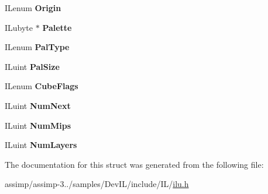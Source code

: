 \begin{DoxyCompactItemize}
\item 
\hypertarget{struct_i_linfo_ac6c29ee25a953e3241e2aea2b33c4729}{I\+Lenum {\bfseries Origin}}\label{struct_i_linfo_ac6c29ee25a953e3241e2aea2b33c4729}

\item 
\hypertarget{struct_i_linfo_aba4b972c5ce55e46ec329e8064003daa}{I\+Lubyte $\ast$ {\bfseries Palette}}\label{struct_i_linfo_aba4b972c5ce55e46ec329e8064003daa}

\item 
\hypertarget{struct_i_linfo_ab505e99ad9677eec785a11533bfa5d73}{I\+Lenum {\bfseries Pal\+Type}}\label{struct_i_linfo_ab505e99ad9677eec785a11533bfa5d73}

\item 
\hypertarget{struct_i_linfo_adaae3e63a61a73bf3c2a3092053763ef}{I\+Luint {\bfseries Pal\+Size}}\label{struct_i_linfo_adaae3e63a61a73bf3c2a3092053763ef}

\item 
\hypertarget{struct_i_linfo_a89fb88cd2ce7abbed0b5911173f20d84}{I\+Lenum {\bfseries Cube\+Flags}}\label{struct_i_linfo_a89fb88cd2ce7abbed0b5911173f20d84}

\item 
\hypertarget{struct_i_linfo_ad1201a015dd266f557eccc97ed2e7c05}{I\+Luint {\bfseries Num\+Next}}\label{struct_i_linfo_ad1201a015dd266f557eccc97ed2e7c05}

\item 
\hypertarget{struct_i_linfo_aebc89ad01ce03ce249a33ea099c4a560}{I\+Luint {\bfseries Num\+Mips}}\label{struct_i_linfo_aebc89ad01ce03ce249a33ea099c4a560}

\item 
\hypertarget{struct_i_linfo_a444c6ff9c4ac659a376a65ba55606fff}{I\+Luint {\bfseries Num\+Layers}}\label{struct_i_linfo_a444c6ff9c4ac659a376a65ba55606fff}

\end{DoxyCompactItemize}


The documentation for this struct was generated from the following file\+:\begin{DoxyCompactItemize}
\item 
assimp/assimp-\/3../samples/\+Dev\+I\+L/include/\+I\+L/\hyperlink{ilu_8h}{ilu.\+h}\end{DoxyCompactItemize}
